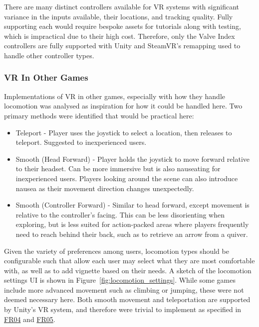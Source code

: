 \documentclass[sigconf]{acmart}
\begin{document}
There are many distinct controllers available for VR systems with significant
variance in the inputs available, their locations, and tracking quality. Fully
supporting each would require bespoke assets for tutorials along with testing,
which is impractical due to their high cost. Therefore, only the Valve Index
controllers are fully supported with Unity and SteamVR's remapping used to
handle other controller types.

\subsubsection{\label{sec:vr_refs}VR In Other Games}

Implementations of VR in other games, especially with how they handle
locomotion was analysed as inspiration for how it could be handled here. Two
primary methods were identified that would be practical here:

\begin{itemize}
  \item Teleport - Player uses the joystick to select a location, then releases
    to teleport. Suggested to inexperienced users.
  \item Smooth (Head Forward) - Player holds the joystick to move forward relative
    to their headset. Can be more immersive but is also nauseating for inexperienced
    users. Players looking around the scene can also introduce nausea as their movement
    direction changes unexpectedly.
  \item Smooth (Controller Forward) - Similar to head forward, except movement
    is relative to the controller's facing. This can be less disorienting when
    exploring, but is less suited for action-packed areas where players frequently
    need to reach behind their back, such as to retrieve an arrow from a quiver.
\end{itemize}

Given the variety of preferences among users, locomotion types should be
configurable such that allow each user may select what they are most comfortable
with, as well as to add vignette based on their needs. A sketch of the locomotion
settings UI is shown in Figure~\ref{fig:locomotion_settings}. While some games include
more advanced movement such as climbing or jumping, these were not deemed
necessary here. Both smooth movement and teleportation are supported by Unity's VR
system, and therefore were trivial to implement as specified in \hyperref[sec:fr_teleport]{FR04}
and \hyperref[sec:fr_smooth]{FR05}.
\end{document}
